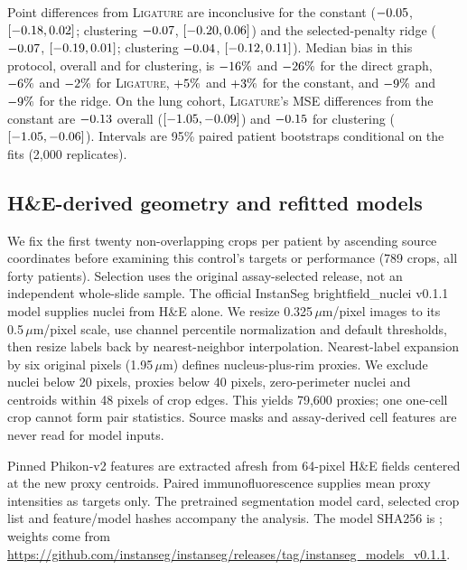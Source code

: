 \documentclass[10pt,letterpaper]{article}
\theoremstyle{definition}
\theoremstyle{remark}
\newcommand{\method}{\textnormal{\textsc{Ligature}}}
\begin{document}
Point differences from \method{} are inconclusive for the constant ($-0.05$, $[-0.18,0.02]$; clustering $-0.07$, $[-0.20,0.06]$) and the selected-penalty ridge ($-0.07$, $[-0.19,0.01]$; clustering $-0.04$, $[-0.12,0.11]$). Median bias in this protocol, overall and for clustering, is $-16\%$ and $-26\%$ for the direct graph, $-6\%$ and $-2\%$ for \method{}, $+5\%$ and $+3\%$ for the constant, and $-9\%$ and $-9\%$ for the ridge. On the lung cohort, \method{}'s MSE differences from the constant are $-0.13$ overall ($[-1.05,-0.09]$) and $-0.15$ for clustering ($[-1.05,-0.06]$). Intervals are 95\% paired patient bootstraps conditional on the fits (2,000 replicates).

\subsection{H\&E-derived geometry and refitted models}
We fix the first twenty non-overlapping crops per patient by ascending source coordinates before examining this control's targets or performance (789 crops, all forty patients). Selection uses the original assay-selected release, not an independent whole-slide sample. The official InstanSeg brightfield\_nuclei v0.1.1 model \citep{instanseg2024} supplies nuclei from H\&E alone. We resize 0.325\,$\mu$m/pixel images to its 0.5\,$\mu$m/pixel scale, use channel percentile normalization and default thresholds, then resize labels back by nearest-neighbor interpolation. Nearest-label expansion by six original pixels (1.95\,$\mu$m) defines nucleus-plus-rim proxies. We exclude nuclei below 20 pixels, proxies below 40 pixels, zero-perimeter nuclei and centroids within 48 pixels of crop edges. This yields 79,600 proxies; one one-cell crop cannot form pair statistics. Source masks and assay-derived cell features are never read for model inputs.

Pinned Phikon-v2 features are extracted afresh from 64-pixel H\&E fields centered at the new proxy centroids. Paired immunofluorescence supplies mean proxy intensities as targets only. The pretrained segmentation model card, selected crop list and feature/model hashes accompany the analysis. The model SHA256 is ; weights come from \url{https://github.com/instanseg/instanseg/releases/tag/instanseg_models_v0.1.1}.
\end{document}
